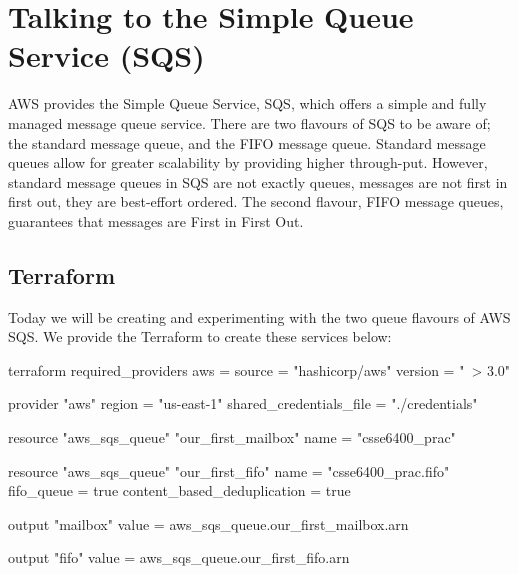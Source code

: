 \documentclass{csse4400}
\begin{document}

\section{Talking to the Simple Queue Service (SQS)}

AWS provides the Simple Queue Service, SQS,
which offers a simple and fully managed message queue service.
There are two flavours of SQS to be aware of;
the standard message queue, and the FIFO message queue.
Standard message queues allow for greater scalability by providing higher through-put.
However, standard message queues in SQS are not exactly queues,
messages are not first in first out,
they are best-effort ordered.
The second flavour, FIFO message queues,
guarantees that messages are First in First Out.

\subsection{Terraform}


Today we will be creating and experimenting with the two queue flavours of AWS SQS.
We provide the Terraform to create these services below:



\begin{code}[language=terraform, numbers=none]{}
  terraform {
    required_providers {
      aws = {
        source = "hashicorp/aws"
        version = "~> 3.0"
      }
    }
  }
  
  provider "aws" {
    region = "us-east-1"
    shared_credentials_file = "./credentials"
  }
  
  resource "aws_sqs_queue" "our_first_mailbox" {
    name                        = "csse6400_prac"
  }
  
  resource "aws_sqs_queue" "our_first_fifo" {
    name                        = "csse6400_prac.fifo"
    fifo_queue                  = true
    content_based_deduplication = true
  }
  
  output "mailbox" {
      value = aws_sqs_queue.our_first_mailbox.arn
  }
  
  output "fifo" {
      value = aws_sqs_queue.our_first_fifo.arn
  }
\end{code}
\end{document}

